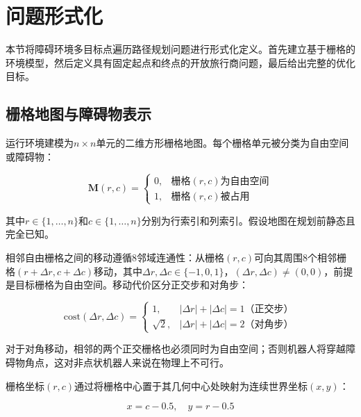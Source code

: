 \documentclass[lettersize,journal]{IEEEtran}
\begin{document}
\section{问题形式化}

\label{sec:form}

本节将障碍环境多目标点遍历路径规划问题进行形式化定义。首先建立基于栅格的环境模型，然后定义具有固定起点和终点的开放旅行商问题，最后给出完整的优化目标。

\subsection{栅格地图与障碍物表示}

运行环境建模为$n \times n$单元的二维方形栅格地图。每个栅格单元被分类为自由空间或障碍物：

\begin{equation}
\mathbf{M}(r, c) =
\begin{cases}
0, & \text{栅格}(r, c)\text{为自由空间} \\
1, & \text{栅格}(r, c)\text{被占用}
\end{cases}
\label{eq:map}
\end{equation}

其中$r \in \{1, \dots, n\}$和$c \in \{1, \dots, n\}$分别为行索引和列索引。假设地图在规划前静态且完全已知。

相邻自由栅格之间的移动遵循8邻域连通性：从栅格$(r, c)$可向其周围8个相邻栅格$(r + \Delta r, c + \Delta c)$移动，其中$\Delta r, \Delta c \in \{-1, 0, 1\}$，$(\Delta r, \Delta c) \neq (0, 0)$，前提是目标栅格为自由空间。移动代价区分正交步和对角步：

\begin{equation}
\mathrm{cost}(\Delta r, \Delta c) =
\begin{cases}
1, & |\Delta r| + |\Delta c| = 1 \text{（正交步）} \\
\sqrt{2}, & |\Delta r| + |\Delta c| = 2 \text{（对角步）}
\end{cases}
\label{eq:stepcost}
\end{equation}

对于对角移动，相邻的两个正交栅格也必须同时为自由空间；否则机器人将穿越障碍物角点，这对非点状机器人来说在物理上不可行。

栅格坐标$(r, c)$通过将栅格中心置于其几何中心处映射为连续世界坐标$(x, y)$：

\begin{equation}
x = c - 0.5, \quad y = r - 0.5
\label{eq:coord}
\end{equation}
\end{document}
